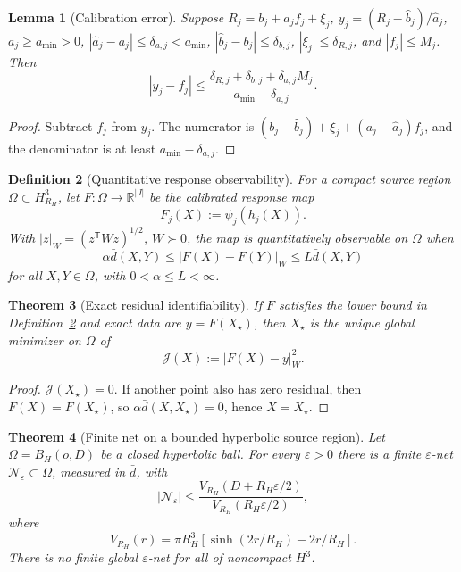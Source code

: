 \documentclass[11pt]{article}
\newtheorem{theorem}{Theorem}[section]
\newtheorem{lemma}[theorem]{Lemma}
\newtheorem{definition}[theorem]{Definition}
\begin{document}
\begin{lemma}[Calibration error]\label{lem:h3-localization-calibration-error}
Suppose \(R_j=b_j+a_jf_j+\xi_j\), \(y_j=(R_j-\widehat b_j)/\widehat a_j\),
\(a_j\geq a_{\min}>0\), \(|\widehat a_j-a_j|\leq\delta_{a,j}<a_{\min}\),
\(|\widehat b_j-b_j|\leq\delta_{b,j}\), \(|\xi_j|\leq\delta_{R,j}\), and
\(|f_j|\leq M_j\). Then
\[
|y_j-f_j|
\leq
\frac{\delta_{R,j}+\delta_{b,j}+\delta_{a,j}M_j}
{a_{\min}-\delta_{a,j}}.
\]
\end{lemma}

\begin{proof}
Subtract \(f_j\) from \(y_j\). The numerator is
\((b_j-\widehat b_j)+\xi_j+(a_j-\widehat a_j)f_j\), and the denominator is at
least \(a_{\min}-\delta_{a,j}\).
\end{proof}

\begin{definition}[Quantitative response observability]\label{def:h3-response-observability}
For a compact source region \(\Omega\subset H^3_{R_H}\), let
\(F:\Omega\to\mathbb R^{|J|}\) be the calibrated response map
\[
F_j(X):=\psi_j(h_j(X)).
\]
With \(|z|_W=(z^{\mathsf T}Wz)^{1/2}\), \(W\succ0\), the map is
quantitatively observable on \(\Omega\) when
\[
\alpha\bar d(X,Y)\leq |F(X)-F(Y)|_W\leq L\bar d(X,Y)
\]
for all \(X,Y\in\Omega\), with \(0<\alpha\leq L<\infty\).
\end{definition}

\begin{theorem}[Exact residual identifiability]\label{thm:h3-exact-residual-identifiability}
If \(F\) satisfies the lower bound in Definition~\ref{def:h3-response-observability}
and exact data are \(y=F(X_\star)\), then \(X_\star\) is the unique global
minimizer on \(\Omega\) of
\[
\mathcal J(X):=|F(X)-y|_W^2.
\]
\end{theorem}

\begin{proof}
\(\mathcal J(X_\star)=0\). If another point also has zero residual, then
\(F(X)=F(X_\star)\), so \(\alpha\bar d(X,X_\star)=0\), hence \(X=X_\star\).
\end{proof}

\begin{theorem}[Finite net on a bounded hyperbolic source region]
\label{thm:h3-finite-localization-net}
Let \(\Omega=B_H(o,D)\) be a closed hyperbolic ball. For every
\(\varepsilon>0\) there is a finite \(\varepsilon\)-net
\(\mathcal N_\varepsilon\subset\Omega\), measured in \(\bar d\), with
\[
|\mathcal N_\varepsilon|
\leq
\frac{V_{R_H}(D+R_H\varepsilon/2)}{V_{R_H}(R_H\varepsilon/2)},
\]
where
\[
V_{R_H}(r)=\pi R_H^3\left[\sinh(2r/R_H)-2r/R_H\right].
\]
There is no finite global \(\varepsilon\)-net for all of noncompact \(H^3\).
\end{theorem}
\end{document}
